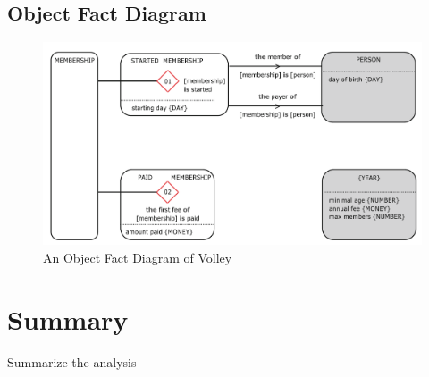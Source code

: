 \subsection{Object Fact Diagram}

\begin{figure}[h]\centering
	\includegraphics[width=12cm]{pic/VolleyOFD.png}
	\caption{An Object Fact Diagram of Volley~\cite{dietz2020enterprise}}
	\label{fig:ofdModel}
\end{figure}


\section{Summary}

Summarize the analysis
